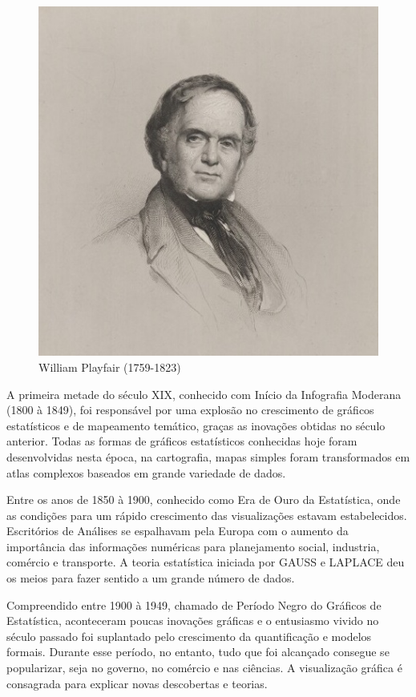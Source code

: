 \vspace{-1.5cm}
\begin{figure}
    \centering
\includegraphics[scale=0.35]{figures/william_playfair.jpeg}
    \caption{William Playfair (1759-1823)}
    \label{fig:my_label4}
\end{figure}







A primeira metade do século XIX, conhecido com Início da Infografia Moderana (1800 à 1849), foi responsável por uma explosão no crescimento de gráficos estatísticos e de mapeamento temático, graças as inovações obtidas no século anterior. Todas as formas de gráficos estatísticos conhecidas hoje foram desenvolvidas nesta época, na cartografia, mapas simples foram transformados em atlas complexos baseados em grande variedade de dados.  
\vskip0.3cm

\inic Entre os anos de 1850 à 1900, conhecido como Era de Ouro da Estatística, onde as condições para um rápido crescimento das visualizações estavam estabelecidos. Escritórios de Análises se espalhavam pela Europa com o aumento da importância das informações numéricas para planejamento social, industria, comércio e transporte. A teoria estatística iniciada por GAUSS e LAPLACE deu os meios para fazer sentido a um grande número de dados.  
\vskip0.3cm 


\inic Compreendido entre 1900 à 1949, chamado de Período Negro do Gráficos de Estatística, aconteceram poucas inovações gráficas e o entusiasmo vivido no século passado foi suplantado pelo crescimento da quantificação e modelos formais. Durante esse período, no entanto, tudo que foi alcançado consegue se popularizar, seja no governo, no comércio e nas ciências. A visualização gráfica é consagrada para explicar novas descobertas e teorias.
\vskip0.3cm 



